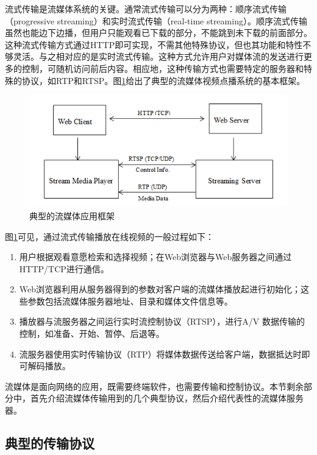 流式传输是流媒体系统的关键。通常流式传输可以分为两种：顺序流式传输（progressive streaming）和实时流式传输（real-time streaming）。顺序流式传输虽然也能边下边播，但用户只能观看已下载的部分，不能跳到未下载的前面部分。这种流式传输方式通过HTTP即可实现，不需其他特殊协议，但也其功能和特性不够灵活。与之相对应的是实时流式传输。这种方式允许用户对媒体流的发送进行更多的控制，可随机访问前后内容。相应地，这种传输方式也需要特定的服务器和特殊的协议，如RTP和RTSP。图\ref{fig:10}给出了典型的流媒体视频点播系统的基本框架。

\begin{figure}[h]
	\centering
	\includegraphics[width = 1.0\linewidth]{clip/10.png}
	\caption{典型的流媒体应用框架\label{fig:10}}
\end{figure}

图\ref{fig:10}可见，通过流式传输播放在线视频的一般过程如下：
\begin{enumerate}
\item 用户根据观看意愿检索和选择视频；在Web浏览器与Web服务器之间通过HTTP/TCP进行通信。
\item Web浏览器利用从服务器得到的参数对客户端的流媒体播放起进行初始化；这些参数包括流媒体服务器地址、目录和媒体文件信息等。
\item 播放器与流服务器之间运行实时流控制协议（RTSP），进行A/V 数据传输的控制，如准备、开始、暂停、后退等。
\item 流服务器使用实时传输协议（RTP）将媒体数据传送给客户端，数据抵达时即可解码播放。
\end{enumerate}

流媒体是面向网络的应用，既需要终端软件，也需要传输和控制协议。本节剩余部分中，首先介绍流媒体传输用到的几个典型协议，然后介绍代表性的流媒体服务器。

\subsection{典型的传输协议}

